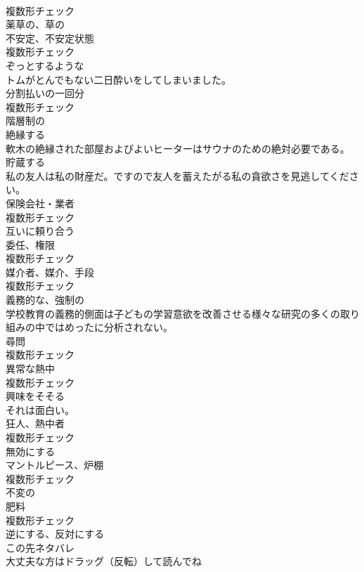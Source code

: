 \documentclass[8pt]{extreport}
\begin{document}
\begin{CJK}{UTF8}{min}
\\	複数形チェック
\\	[形容詞]	薬草の、草の	
\\	[名詞]	不安定、不安定状態	
\\	複数形チェック
\\	[形容詞]	ぞっとするような	
\\	トムがとんでもない二日酔いをしてしまいました。	
\\	[名詞]	分割払いの一回分	
\\	複数形チェック
\\	[形容詞]	階層制の	
\\	[動詞]	絶縁する	
\\	軟木の絶縁された部屋およびよいヒーターはサウナのための絶対必要である。	
\\	[動詞]	貯蔵する	
\\	私の友人は私の財産だ。ですので友人を蓄えたがる私の貪欲さを見逃してください。	
\\	[名詞]	保険会社・業者	
\\	複数形チェック
\\	[形容詞]	互いに頼り合う	
\\	[名詞]	委任、権限	
\\	複数形チェック
\\	[名詞]	媒介者、媒介、手段	
\\	複数形チェック
\\	[形容詞]	義務的な、強制の	
\\	学校教育の義務的側面は子どもの学習意欲を改善させる様々な研究の多くの取り組みの中ではめったに分析されない。	
\\	[名詞]	尋問	
\\	複数形チェック
\\	[名詞]	異常な熱中	
\\	複数形チェック
\\	[形容詞]	興味をそそる	
\\	それは面白い。	
\\	[名詞]	狂人、熱中者	
\\	複数形チェック
\\	[動詞]	無効にする	
\\	[名詞]	マントルピース、炉棚	
\\	複数形チェック
\\	[形容詞]	不変の	
\\	[名詞]	肥料	
\\	複数形チェック
\\	[動詞]	逆にする、反対にする	
\\	この先ネタバレ
\\	大丈夫な方はドラッグ（反転）して読んでね

\end{CJK}
\end{document}
